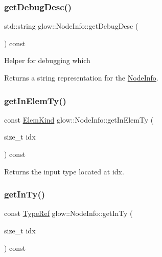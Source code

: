 \subsubsection{\texorpdfstring{get\+Debug\+Desc()}{getDebugDesc()}}
{\footnotesize\ttfamily std\+::string glow\+::\+Node\+Info\+::get\+Debug\+Desc (\begin{DoxyParamCaption}{ }\end{DoxyParamCaption}) const\hspace{0.3cm}{\ttfamily [inline]}}

Helper for debugging which \begin{DoxyReturn}{Returns}
a string representation for the \hyperlink{classglow_1_1_node_info}{Node\+Info}. 
\end{DoxyReturn}
\mbox{\label{classglow_1_1_node_info_acf9bbfa62aa8ae0f0bc716c7054bdb52}} 
\subsubsection{\texorpdfstring{get\+In\+Elem\+Ty()}{getInElemTy()}}
{\footnotesize\ttfamily const \hyperlink{namespaceglow_ab92e14a94329daf4083db670e95fbcdf}{Elem\+Kind} glow\+::\+Node\+Info\+::get\+In\+Elem\+Ty (\begin{DoxyParamCaption}\item[{size\+\_\+t}]{idx }\end{DoxyParamCaption}) const\hspace{0.3cm}{\ttfamily [inline]}}

\begin{DoxyReturn}{Returns}
the input type located at {\ttfamily idx}. 
\end{DoxyReturn}
\mbox{\label{classglow_1_1_node_info_a8f1cb453edfdfd694c8e345a5ba53d23}} 
\subsubsection{\texorpdfstring{get\+In\+Ty()}{getInTy()}}
{\footnotesize\ttfamily const \hyperlink{structglow_1_1_type}{Type\+Ref} glow\+::\+Node\+Info\+::get\+In\+Ty (\begin{DoxyParamCaption}\item[{size\+\_\+t}]{idx }\end{DoxyParamCaption}) const\hspace{0.3cm}{\ttfamily [inline]}}


